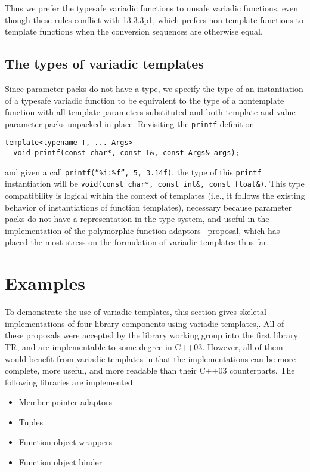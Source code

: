 \documentclass{article}
\begin{document}
Thus we prefer the typesafe variadic functions to unsafe variadic
functions, even though these rules conflict with 13.3.3p1, which
prefers non-template functions to template functions when the
conversion sequences are otherwise equal.

\subsection{The types of variadic templates}
Since parameter packs do not have a type, we specify the
type of an instantiation of a typesafe variadic function to be equivalent
to the type of a nontemplate function with all template parameters
substituted and both template and value parameter packs unpacked
in place. Revisiting the {\tt printf} definition

\begin{verbatim}
template<typename T, ... Args>
  void printf(const char*, const T&, const Args& args);
\end{verbatim}

and given a call {\tt printf(``\%i:\%f'', 5, 3.14f)}, the type of this
{\tt printf} instantiation will be {\tt void(const char*, const int\&,
  const float\&)}. This type compatibility is logical within the
context of templates (i.e., it follows the existing behavior of
instantiations of function templates), necessary because parameter
packs do not have a representation in the type system, and useful in the
implementation of the polymorphic function adaptors~\cite{Gregor02}
proposal, which has placed the most stress on the formulation of
variadic templates thus far.

\section{Examples}
To demonstrate the use of variadic templates, this section gives
skeletal implementations of four library components using variadic
templates,. All of these proposals were accepted by the library
working group into the first library TR, and are implementable to some
degree in C++03. However, all of them would benefit from variadic
templates in that the implementations can be more complete, more
useful, and more readable than their C++03 counterparts. The following
libraries are implemented:

\begin{itemize}
\item Member pointer adaptors~\cite{Dimov03a}
\item Tuples~\cite{Jarvi02}
\item Function object wrappers~\cite{Gregor02}
\item Function object binder~\cite{Dimov03b}
\end{itemize}
\end{document}
